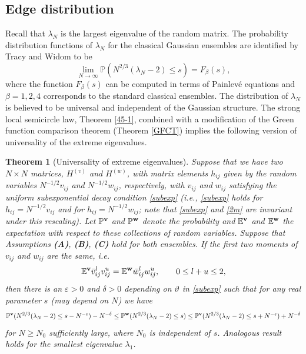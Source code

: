 \documentclass[draft]{article}
\newcommand{\e}{\varepsilon}
\newcommand{\bv}{{\bf{v}}}
\newcommand{\bw}{{\bf{w}}}
\newcommand{\be}{\begin{equation}}
\newcommand{\ee}{\end{equation}}
\newcommand{\E}{{\mathbb E }}
\renewcommand{\P}{{\mathbb P}}
\newtheorem{theorem}{Theorem}
\numberwithin{equation}{section}
\numberwithin{theorem}{section}
\numberwithin{definition}{section}
\numberwithin{remark}{section}
\begin{document}
\subsection{Edge distribution}

Recall that $\lambda_N$ is the largest eigenvalue of the random matrix.  The 
probability distribution  functions of $\lambda_N$ for the classical Gaussian ensembles are
identified by Tracy and Widom  \cite{TW, TW2} to be  
\be\label{Fb}
\lim_{N \to \infty} \P( N^{2/3} ( \lambda_N -2) \le s ) =  F_\beta (s), 
\ee
where the function $F_\beta(s)$ can be computed in terms 
of Painlev\'e equations and $\beta=1, 2, 4$
 corresponds to the standard classical  ensembles. The distribution of $\lambda_N$ 
is believed to be universal and independent of the Gaussian structure. 
 The strong local semicircle law, Theorem \ref{45-1},
combined with a modification of the Green function comparison theorem
(Theorem \ref{GFCT})
implies  the following 
version of universality of the extreme eigenvalues. 




\bigskip

\begin{theorem}[Universality of extreme eigenvalues] \label{twthm}  
Suppose that we have 
two  $N\times N$  matrices, $H^{(v)}$ and $H^{(w)}$, with matrix elements $h_{ij}$
given by the random variables $N^{-1/2} v_{ij}$ and 
$N^{-1/2} w_{ij}$, respectively, with $v_{ij}$ and $w_{ij}$ satisfying
the uniform subexponential decay condition \eqref{subexp} (i.e., \eqref{subexp} holds
for $h_{ij}=N^{-1/2} v_{ij}$ and for $h_{ij}=N^{-1/2} w_{ij}$; note that \eqref{subexp}
and \eqref{2m} are invariant under this rescaling). Let $\P^\bv$ and
$\P^\bw$ denote the probability and $\E^\bv$ and $\E^\bw$ 
the expectation with respect to these collections of random variables.
Suppose that Assumptions {\bf (A)}, {\bf (B)}, {\bf (C)}  hold for both ensembles.  If 
the first two moments of
 $v_{ij}$ and $w_{ij}$ are the same, i.e.
\be\label{2m}
    \E^\bv \bar v_{ij}^l v_{ij}^{u} =  \E^\bw \bar w_{ij}^l w_{ij}^{u},
  \qquad 0\le l+u\le 2,
\ee
then there is an $\e>0$ and $\delta>0$
depending on $\vartheta$ in \eqref{subexp} 
 such that 
for any real parameter $s$ (may depend on $N$)   
we have
 \be\label{tw}
 \P^\bv ( N^{2/3} ( \lambda_N -2) \le s- N^{-\e} )- N^{-\delta}  
  \le   \P^\bw ( N^{2/3} ( \lambda_N -2) \le s )   \le 
 \P^\bv ( N^{2/3} ( \lambda_N -2) \le s+ N^{-\e} )+ N^{-\delta}  
\ee 
for $N\ge N_0$ sufficiently  large, where $N_0$ is independent of $s$. 
Analogous result holds for the smallest eigenvalue $\lambda_1$.


\end{theorem}
\end{document}
